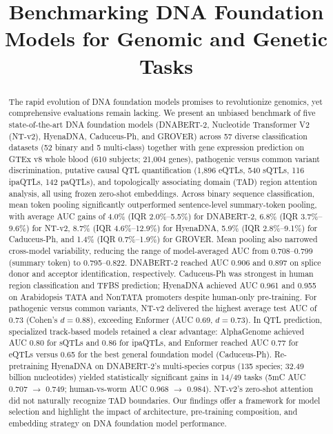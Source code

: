 \documentclass[11pt,a4paper]{article}
\title{Benchmarking DNA Foundation Models for Genomic and Genetic Tasks}
\author{}
\date{}
\begin{document}
\maketitle

\begin{abstract}
The rapid evolution of DNA foundation models promises to revolutionize genomics, yet comprehensive evaluations remain lacking. We present an unbiased benchmark of five state-of-the-art DNA foundation models (DNABERT-2, Nucleotide Transformer V2 (NT-v2), HyenaDNA, Caduceus-Ph, and GROVER) across 57 diverse classification datasets (52 binary and 5 multi-class) together with gene expression prediction on GTEx v8 whole blood (610 subjects; 21{,}004 genes), pathogenic versus common variant discrimination, putative causal QTL quantification (1{,}896 eQTLs, 540 sQTLs, 116 ipaQTLs, 142 paQTLs), and topologically associating domain (TAD) region attention analysis, all using frozen zero-shot embeddings. Across binary sequence classification, mean token pooling significantly outperformed sentence-level summary-token pooling, with average AUC gains of 4.0\% (IQR 2.0\%--5.5\%) for DNABERT-2, 6.8\% (IQR 3.7\%--9.6\%) for NT-v2, 8.7\% (IQR 4.6\%--12.9\%) for HyenaDNA, 5.9\% (IQR 2.8\%--9.1\%) for Caduceus-Ph, and 1.4\% (IQR 0.7\%--1.9\%) for GROVER. Mean pooling also narrowed cross-model variability, reducing the range of model-averaged AUC from 0.708--0.799 (summary token) to 0.795--0.822. DNABERT-2 reached AUC 0.906 and 0.897 on splice donor and acceptor identification, respectively. Caduceus-Ph was strongest in human region classification and TFBS prediction; HyenaDNA achieved AUC 0.961 and 0.955 on Arabidopsis TATA and NonTATA promoters despite human-only pre-training. For pathogenic versus common variants, NT-v2 delivered the highest average test AUC of 0.73 (Cohen's $d=0.88$), exceeding Enformer (AUC 0.69, $d=0.73$). In QTL prediction, specialized track-based models retained a clear advantage: AlphaGenome achieved AUC 0.80 for sQTLs and 0.86 for ipaQTLs, and Enformer reached AUC 0.77 for eQTLs versus 0.65 for the best general foundation model (Caduceus-Ph). Re-pretraining HyenaDNA on DNABERT-2's multi-species corpus (135 species; 32.49 billion nucleotides) yielded statistically significant gains in 14/49 tasks (5mC AUC 0.707 $\rightarrow$ 0.749; human-vs-worm AUC 0.968 $\rightarrow$ 0.984). NT-v2's zero-shot attention did not naturally recognize TAD boundaries. Our findings offer a framework for model selection and highlight the impact of architecture, pre-training composition, and embedding strategy on DNA foundation model performance.
\end{abstract}
\end{document}
